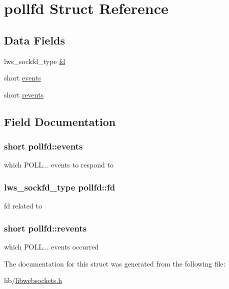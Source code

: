 \hypertarget{structpollfd}{}\section{pollfd Struct Reference}
\label{structpollfd}
\subsection*{Data Fields}
\begin{DoxyCompactItemize}
\item 
lws\+\_\+sockfd\+\_\+type \hyperlink{structpollfd_af084f089bdece61d177f85782d6673d0}{fd}
\item 
short \hyperlink{structpollfd_ac9b2f2c5b1f9a7487eb57e67cd4960ef}{events}
\item 
short \hyperlink{structpollfd_aafb457d11cac415faf0e1e2b825118c2}{revents}
\end{DoxyCompactItemize}


\subsection{Field Documentation}
\subsubsection[{\texorpdfstring{events}{events}}]{\setlength{\rightskip}{0pt plus 5cm}short pollfd\+::events}\hypertarget{structpollfd_ac9b2f2c5b1f9a7487eb57e67cd4960ef}{}\label{structpollfd_ac9b2f2c5b1f9a7487eb57e67cd4960ef}
which P\+O\+LL... events to respond to 
\subsubsection[{\texorpdfstring{fd}{fd}}]{\setlength{\rightskip}{0pt plus 5cm}lws\+\_\+sockfd\+\_\+type pollfd\+::fd}\hypertarget{structpollfd_af084f089bdece61d177f85782d6673d0}{}\label{structpollfd_af084f089bdece61d177f85782d6673d0}
fd related to 
\subsubsection[{\texorpdfstring{revents}{revents}}]{\setlength{\rightskip}{0pt plus 5cm}short pollfd\+::revents}\hypertarget{structpollfd_aafb457d11cac415faf0e1e2b825118c2}{}\label{structpollfd_aafb457d11cac415faf0e1e2b825118c2}
which P\+O\+LL... events occurred 

The documentation for this struct was generated from the following file\+:\begin{DoxyCompactItemize}
\item 
lib/\hyperlink{libwebsockets_8h}{libwebsockets.\+h}\end{DoxyCompactItemize}
